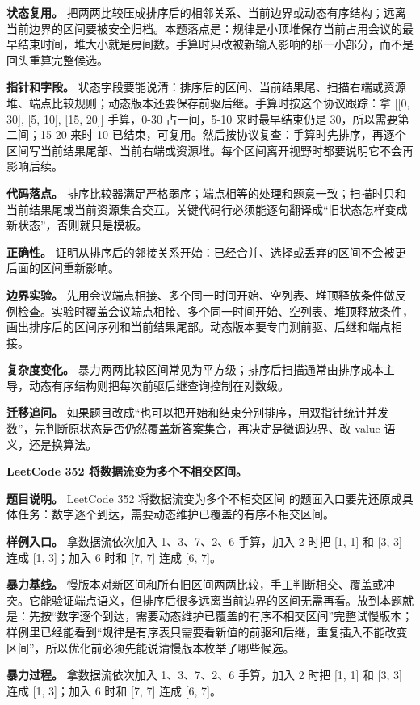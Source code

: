 \textbf{状态复用。} 把两两比较压成排序后的相邻关系、当前边界或动态有序结构；远离当前边界的区间要被安全归档。本题落点是：规律是小顶堆保存当前占用会议的最早结束时间，堆大小就是房间数。手算时只改被新输入影响的那一小部分，而不是回头重算完整候选。

\textbf{指针和字段。} 状态字段要能说清：排序后的区间、当前结果尾、扫描右端或资源堆、端点比较规则；动态版本还要保存前驱后继。手算时按这个协议跟踪：拿 [[0, 30], [5, 10], [15, 20]] 手算，0-30 占一间，5-10 来时最早结束仍是 30，所以需要第二间；15-20 来时 10 已结束，可复用。然后按协议复查：手算时先排序，再逐个区间写当前结果尾部、当前右端或资源堆。每个区间离开视野时都要说明它不会再影响后续。

\textbf{代码落点。} 排序比较器满足严格弱序；端点相等的处理和题意一致；扫描时只和当前结果尾或当前资源集合交互。关键代码行必须能逐句翻译成“旧状态怎样变成新状态”，否则就只是模板。

\textbf{正确性。} 证明从排序后的邻接关系开始：已经合并、选择或丢弃的区间不会被更后面的区间重新影响。

\textbf{边界实验。} 先用会议端点相接、多个同一时间开始、空列表、堆顶释放条件做反例检查。实验时覆盖会议端点相接、多个同一时间开始、空列表、堆顶释放条件，画出排序后的区间序列和当前结果尾部。动态版本要专门测前驱、后继和端点相接。

\textbf{复杂度变化。} 暴力两两比较区间常见为平方级；排序后扫描通常由排序成本主导，动态有序结构则把每次前驱后继查询控制在对数级。

\textbf{迁移追问。} 如果题目改成“也可以把开始和结束分别排序，用双指针统计并发数”，先判断原状态是否仍然覆盖新答案集合，再决定是微调边界、改 value 语义，还是换算法。

\noindent\textbf{LeetCode 352 将数据流变为多个不相交区间。}

\textbf{题目说明。} LeetCode 352 将数据流变为多个不相交区间 的题面入口要先还原成具体任务：数字逐个到达，需要动态维护已覆盖的有序不相交区间。

\textbf{样例入口。} 拿数据流依次加入 1、3、7、2、6 手算，加入 2 时把 [1, 1] 和 [3, 3] 连成 [1, 3]；加入 6 时和 [7, 7] 连成 [6, 7]。

\textbf{暴力基线。} 慢版本对新区间和所有旧区间两两比较，手工判断相交、覆盖或冲突。它能验证端点语义，但排序后很多远离当前边界的区间无需再看。放到本题就是：先按“数字逐个到达，需要动态维护已覆盖的有序不相交区间”完整试慢版本；样例里已经能看到“规律是有序表只需要看新值的前驱和后继，重复插入不能改变区间”，所以优化前必须先能说清慢版本枚举了哪些候选。

\textbf{暴力过程。} 拿数据流依次加入 1、3、7、2、6 手算，加入 2 时把 [1, 1] 和 [3, 3] 连成 [1, 3]；加入 6 时和 [7, 7] 连成 [6, 7]。

